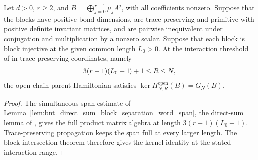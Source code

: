 \begin{theorem}
    \label{thm:ph_primitive_blocks_sharp_open_kernel}
    \leanok
    Let $d>0$, $r\ge2$, and $B=\bigoplus_{j=0}^{r-1}\mu_jA^j$, with all
    coefficients nonzero. Suppose that the blocks have positive bond
    dimensions, are trace-preserving and primitive with positive definite
    invariant matrices, and are pairwise inequivalent under conjugation
    and multiplication by a nonzero scalar.
    Suppose that each block is block injective at the given common length
    $L_0>0$. At the interaction threshold of
    \cite[Theorem~12]{PerezGarcia2007Matrix} in trace-preserving coordinates,
    namely
    \begin{align}
        3(r-1)(L_0+1)+1\le R\le N,
        \notag
    \end{align}
    the open-chain parent Hamiltonian satisfies
    $\ker H^{\mathrm{open}}_{N,R}(B)=G_N(B)$.
\end{theorem}
\begin{proof}
    \leanok
    The simultaneous-span estimate of
    Lemma~\ref{lem:bnt_direct_sum_block_separation_word_span}, the direct-sum
    lemma of \cite[lines~1346--1408]{PerezGarcia2007Matrix}, gives the full
    product matrix algebra at length $3(r-1)(L_0+1)$. Trace-preserving propagation keeps
    the span full at every larger length. The block intersection theorem
    therefore gives the kernel identity at the stated interaction range.
\end{proof}

